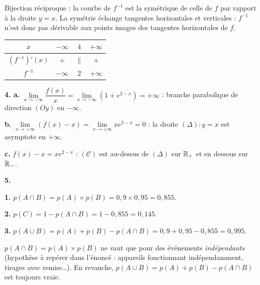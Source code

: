 \documentclass[11pt]{article}
\begin{document}
\begin{rappel}
Bijection réciproque : la courbe de $f^{-1}$ est la symétrique de celle
de $f$ par rapport à la droite $y = x$. La symétrie échange tangentes
horizontales et verticales : $f^{-1}$ n'est donc pas dérivable aux
points images des tangentes horizontales de $f$.
\end{rappel}
\begin{center}\renewcommand{\arraystretch}{1.4}
\begin{tabular}{|c|ccc|}
\hline $x$ & $-\infty$ & $4$ & $+\infty$ \\\hline $(f^{-1})'(x)$ & $+$ & $\|$ & $+$ \\\hline $f^{-1}$ & $-\infty$ & $2$ & $+\infty$ \\\hline
\end{tabular}
\end{center}

\textbf{4. a.} $\lim\limits_{x\to-\infty}\dfrac{f(x)}{x} = \lim\limits_{x\to-\infty}(1 + e^{2-x}) = +\infty$ : branche parabolique de direction $(Oy)$ en $-\infty$.

\textbf{b.} $\lim\limits_{x\to+\infty}(f(x) - x) = \lim\limits_{x\to+\infty} x e^{2-x} = 0$ : la droite $(\Delta) : y = x$ est asymptote en $+\infty$.

\textbf{c.} $f(x) - x = x e^{2-x}$ : $(\mathcal{C})$ est au-dessus de $(\Delta)$ sur $\mathbb{R}_+$ et en dessous sur $\mathbb{R}_-$.

\textbf{5.}
\begin{center}
\end{center}

\textbf{1.} $p(A \cap B) = p(A)\times p(B) = 0{,}9\times 0{,}95 = 0{,}855$.

\textbf{2.} $p(C) = 1 - p(A \cap B) = 1 - 0{,}855 = 0{,}145$.

\textbf{3.} $p(A \cup B) = p(A) + p(B) - p(A \cap B) = 0{,}9 + 0{,}95 - 0{,}855 = 0{,}995$.

\begin{rappel}
$p(A \cap B) = p(A) \times p(B)$ ne vaut que pour des événements
\emph{indépendants} (hypothèse à repérer dans l'énoncé : appareils
fonctionnant indépendamment, tirages avec remise…). En revanche,
$p(A \cup B) = p(A) + p(B) - p(A \cap B)$ est toujours vraie.
\end{rappel}
\end{document}
